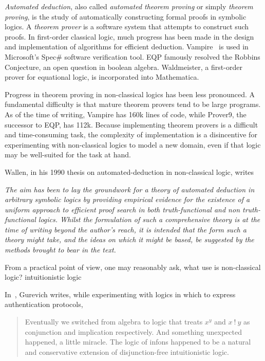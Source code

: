

\emph{Automated deduction}, also called \emph{automated theorem proving} or simply
\emph{theorem proving}, is the study of
automatically constructing formal proofs in symbolic logics.  A \emph{theorem prover}
is a software system that attempts to construct such proofs.  In first-order
classical logic, much progress has been made in the design and implementation
of algorithms for
efficient deduction.  Vampire~\cite{Voronkov.1999.CADE} is used in
Microsoft's Spec\# software verification tool.
EQP famously resolved the Robbins Conjecture, an open question
in boolean algebra.  Waldmeister, a first-order prover for equational
logic, is incorporated into Mathematica.

Progress in theorem proving in non-classical logics has been less pronounced.
A fundamental difficulty is that mature theorem provers tend to be large programs.
As of the time of writing, Vampire has 160k lines of code, while
Prover9, the successor to EQP, has 112k.  Because implementing theorem provers
is a difficult and time-consuming task, the complexity of implementation
is a disincentive for experimenting with
non-classical logics to model a new domain, even if that logic may be well-suited
for the task at hand.

Wallen, in his 1990 thesis on automated-deduction in non-classical logic, writes

\vspace{1em}

\noindent
\textit{The aim has been to lay the groundwork for a theory of automated deduction in
arbitrary symbolic logics by providing empirical evidence for the existence of
a \emph{uniform} approach to efficient proof search in both truth-functional and
non truth-functional logics.  Whilst the formulation of such a comprehensive
theory is at the time of writing beyond the author's reach, it is intended that
the form such a theory might take, and the ideas on which it might be based, be
suggested by the methods brought to bear in the text.}~\cite{Wallen.1990.Book}

\vspace{1em}


From a practical point of view, one may reasonably ask,
what use is non-classical logic?  intuitionistic logic

In~\citep{Gurevich.2009.DKAL2}, Gurevich writes,
while experimenting with logics in which to express authentication protocols,

\noindent
\begin{quote}
Eventually we switched from algebra to logic that treats $x ^ y$ and $x~!~y$ as
conjunction and implication respectively. And something unexpected happened,
a little miracle. The logic of infons happened to be a natural and conservative
extension of disjunction-free intuitionistic logic.
\end{quote}


